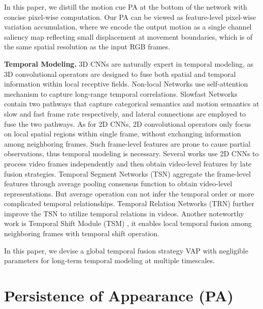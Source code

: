 \documentclass[journal]{IEEEtran}
\begin{document}
In this paper, we distill the motion cue PA at the bottom of the network with concise pixel-wise computation. Our PA can be viewed as feature-level pixel-wise variation accumulation, where we encode the output motion as a single channel saliency map reflecting small displacement at movement boundaries, which is of the same spatial resolution as the input RGB frames.


\textbf{Temporal Modeling.} 3D CNNs are naturally expert in temporal modeling, as 3D convolutional operators are designed to fuse both spatial and temporal information within local receptive fields. Non-local Networks \cite{Wang_2018_CVPR} use self-attention mechanism to capture long-range temporal correlations. Slowfast Networks \cite{Feichtenhofer2019SlowFastNF} contain two pathways that capture categorical semantics and motion semantics at slow and fast frame rate respectively, and lateral connections are employed to fuse the two pathways. As for 2D CNNs, 2D convolutional operators only focus on local spatial regions within single frame, without exchanging information among neighboring frames. Such frame-level features are prone to cause partial observations, thus temporal modeling is necessary. Several works \cite{feichtenhofer2016convolutional,wang2016temporal,girdhar2017actionvlad,zhou2018temporal} use 2D CNNs to process video frames independently and then obtain video-level features by late fusion strategies. Temporal Segment Networks (TSN) \cite{wang2016temporal} aggregate the frame-level features through average pooling consensus function to obtain video-level representations. But average operation can not infer the temporal order or more complicated temporal relationships. Temporal Relation Networks (TRN) \cite{zhou2018temporal} further improve the TSN to utilize temporal relations in videos. Another noteworthy work is Temporal Shift Module (TSM) \cite{lin2019tsm}, it enables local temporal fusion among neighboring frames with temporal shift operation.

In this paper, we devise a global temporal fusion strategy VAP with negligible parameters for long-term temporal modeling at multiple timescales.







\section{Persistence of Appearance (PA)} \label{section:PA}
\end{document}

